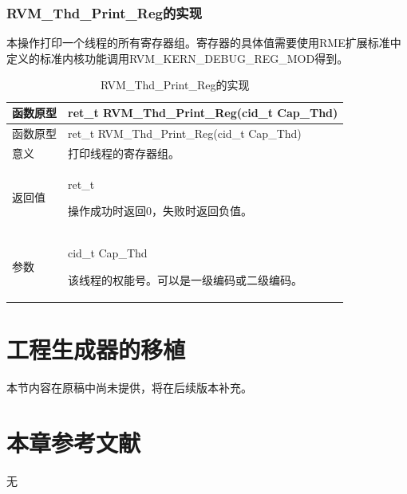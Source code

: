 \newpage
\subsubsection{RVM\_Thd\_Print\_Reg的实现}\label{subsubsec:8-2-7-4}

本操作打印一个线程的所有寄存器组。寄存器的具体值需要使用RME扩展标准中定义的标准内核功能调用RVM\_KERN\_DEBUG\_REG\_MOD得到。

\begin{xltabular}{\textwidth}{@{}>{\hsize\raggedright\arraybackslash}X>{\hsize\raggedright\arraybackslash}X@{}}
\caption{RVM\_\allowbreak{}Thd\_\allowbreak{}Print\_\allowbreak{}Reg的实现}\label{tab:8-17}\\
\toprule
函数原型 & ret\_\allowbreak{}t RVM\_\allowbreak{}Thd\_\allowbreak{}Print\_\allowbreak{}Reg(cid\_\allowbreak{}t Cap\_\allowbreak{}Thd)\tabularnewline
\endfirsthead
\toprule
函数原型 & ret\_\allowbreak{}t RVM\_\allowbreak{}Thd\_\allowbreak{}Print\_\allowbreak{}Reg(cid\_\allowbreak{}t Cap\_\allowbreak{}Thd)\tabularnewline
\midrule
\endhead
\bottomrule
\endlastfoot
意义 & 打印线程的寄存器组。\tabularnewline
返回值\strut
 & ret\_\allowbreak{}t

操作成功时返回0，失败时返回负值。\strut
\tabularnewline
参数\strut
 & cid\_\allowbreak{}t Cap\_\allowbreak{}Thd

该线程的权能号。可以是一级编码或二级编码。\strut
\tabularnewline
\end{xltabular}

\section{工程生成器的移植}\label{sec:8-3}

本节内容在原稿中尚未提供，将在后续版本补充。

\section{本章参考文献}\label{sec:8-4}

无

